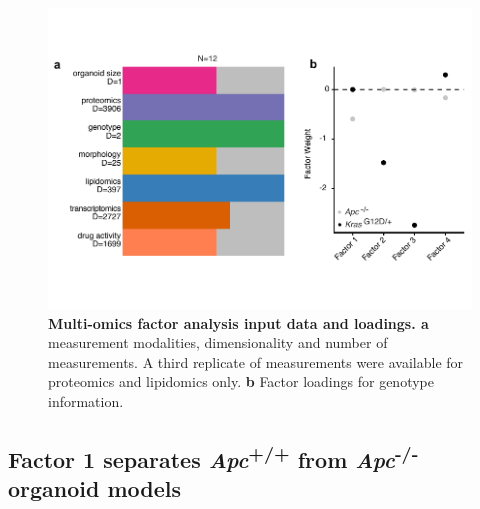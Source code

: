 \begin{flushleft}
\begin{figure}[h!]
\centering
\includegraphics[width=400pt,
                height=\textheight,
                keepaspectratio]{figures/adenomaprofiling/pdf/fig_1_8.pdf}
\caption[Multi-omics factor analysis input data and loadings]{\textbf{Multi-omics factor analysis input data and loadings. a} measurement modalities, dimensionality and number of measurements. A third replicate of measurements were available for proteomics and lipidomics only. \textbf{b} Factor loadings for genotype information.} 
\label{fig_180}
\end{figure}
\bigbreak

\clearpage
\subsection{Factor 1 separates \textit{Apc}\textsuperscript{+/+} from \textit{Apc}\textsuperscript{-/-} organoid models}


\end{flushleft}
